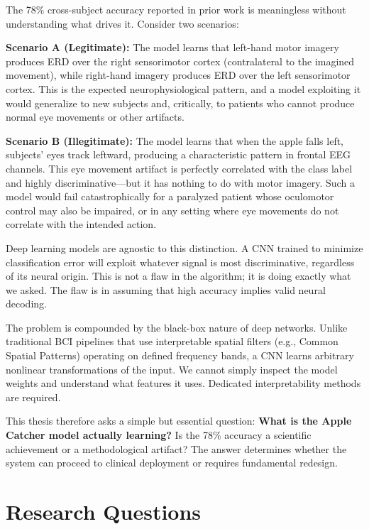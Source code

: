The 78\% cross-subject accuracy reported in prior work is meaningless without understanding what drives it. Consider two scenarios:

\textbf{Scenario A (Legitimate):} The model learns that left-hand motor imagery produces ERD over the right sensorimotor cortex (contralateral to the imagined movement), while right-hand imagery produces ERD over the left sensorimotor cortex. This is the expected neurophysiological pattern, and a model exploiting it would generalize to new subjects and, critically, to patients who cannot produce normal eye movements or other artifacts.

\textbf{Scenario B (Illegitimate):} The model learns that when the apple falls left, subjects' eyes track leftward, producing a characteristic pattern in frontal EEG channels. This eye movement artifact is perfectly correlated with the class label and highly discriminative—but it has nothing to do with motor imagery. Such a model would fail catastrophically for a paralyzed patient whose oculomotor control may also be impaired, or in any setting where eye movements do not correlate with the intended action.

Deep learning models are agnostic to this distinction. A CNN trained to minimize classification error will exploit whatever signal is most discriminative, regardless of its neural origin. This is not a flaw in the algorithm; it is doing exactly what we asked. The flaw is in assuming that high accuracy implies valid neural decoding.

The problem is compounded by the black-box nature of deep networks. Unlike traditional BCI pipelines that use interpretable spatial filters (e.g., Common Spatial Patterns) operating on defined frequency bands, a CNN learns arbitrary nonlinear transformations of the input. We cannot simply inspect the model weights and understand what features it uses. Dedicated interpretability methods are required.

This thesis therefore asks a simple but essential question: \textbf{What is the Apple Catcher model actually learning?} Is the 78\% accuracy a scientific achievement or a methodological artifact? The answer determines whether the system can proceed to clinical deployment or requires fundamental redesign.


\section{Research Questions}
\label{sec:intro_rqs}


